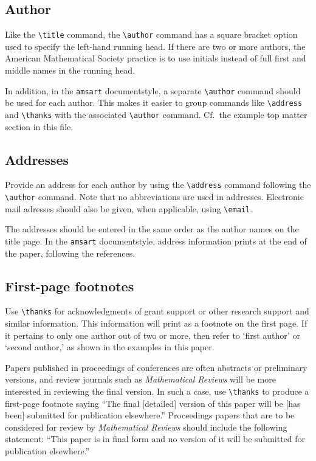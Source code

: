 \subsection{Author}
Like the \verb=\title= command, the \verb=\author= command has a square bracket
option used to specify the left-hand running head.  If there are two or more
authors, the American Mathematical Society practice is to use initials
instead of full first and middle names in the running head.

In addition, in the {\tt amsart} documentstyle, a separate
\verb=\author= command should be used for each author.
This makes it easier to group commands like
\verb=\address= and \verb=\thanks= with the associated
\verb=\author= command.  Cf.~the example top matter section
in this file.

\subsection{Addresses}
Provide an address for each author by using the \verb=\address=
command following the \verb=\author= command.  Note that
no abbreviations are used in addresses.  Electronic mail adresses
should also be given, when applicable, using \verb=\email=.

The addresses should be entered in the same order as the author names
on the title page.  In the {\tt amsart} documentstyle, address
information prints at the end of the paper, following the references.

\subsection{First-page footnotes}
Use \verb=\thanks= for acknowledgments of grant support or other
research support and similar information. This information will print
as a footnote on the first page. If it pertains to only one author out
of two or more, then refer to `first author' or `second author,' as
shown in the examples in this paper.

Papers published in proceedings of conferences are often abstracts or
preliminary versions, and review journals such as {\it Mathematical
Reviews\/} will be more interested in reviewing the final version.  In
such a case, use \verb=\thanks= to produce a first-page footnote
saying ``The final [detailed] version of this paper will be [has been]
submitted for publication elsewhere.''  Proceedings papers that are
to be considered for review by {\it Mathematical Reviews\/} should
include the following statement: ``This paper is in final form and no
version of it will be submitted for publication elsewhere.''

